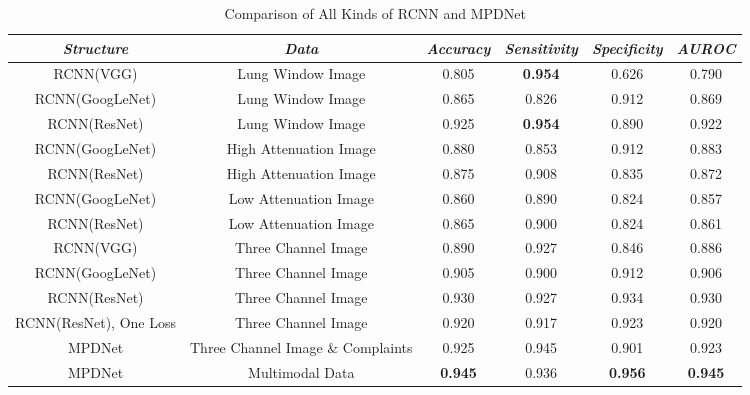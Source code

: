 \documentclass[journal]{IEEEtran}
\begin{document}
\begin{table}[htb]
    \caption{Comparison of All Kinds of RCNN and MPDNet}
    \begin{center}
    \begin{tabular}{|c|c|c|c|c|c|}

    \hline
    \textbf{\textit{Structure}} & \textbf{\textit{Data}}& \textbf{\textit{Accuracy}}  & \textbf{\textit{Sensitivity}} & \textbf{\textit{Specificity}} & \textbf{\textit{AUROC}}\\
    \hline
    RCNN(VGG) & Lung Window Image & 0.805 & {\bfseries 0.954} &0.626 &0.790 \\
    RCNN(GoogLeNet) & Lung Window Image& 0.865 & 0.826 & 0.912 & 0.869 \\
    RCNN(ResNet) & Lung Window Image & 0.925 & {\bfseries 0.954} & 0.890 & 0.922 \\
    RCNN(GoogLeNet) & High Attenuation Image& 0.880 & 0.853 & 0.912 & 0.883 \\
    RCNN(ResNet)& High Attenuation Image& 0.875 & 0.908 & 0.835 & 0.872 \\
    RCNN(GoogLeNet) & Low Attenuation Image& 0.860 & 0.890 & 0.824 & 0.857 \\
    RCNN(ResNet) & Low Attenuation Image& 0.865 & 0.900 & 0.824 & 0.861 \\
    RCNN(VGG) & Three Channel Image& 0.890 & 0.927 &0.846 &0.886 \\
    RCNN(GoogLeNet)& Three Channel Image & 0.905 & 0.900 & 0.912 & 0.906 \\
    RCNN(ResNet) & Three Channel Image&  0.930 & 0.927 &  0.934 &  0.930 \\
    RCNN(ResNet), One Loss & Three Channel Image& 0.920 & 0.917 & 0.923 & 0.920 \\
    \hline
    MPDNet & Three Channel Image \& Complaints & 0.925 & 0.945 & 0.901 & 0.923 \\
    MPDNet & Multimodal Data&  {\bfseries 0.945} & 0.936 & {\bfseries 0.956} & {\bfseries 0.945} \\
    \hline

    \end{tabular}
    \vspace{-0cm}
    \label{rcnncompare}
    \end{center}
    \vspace{-0cm}
    \end{table}
\end{document}
